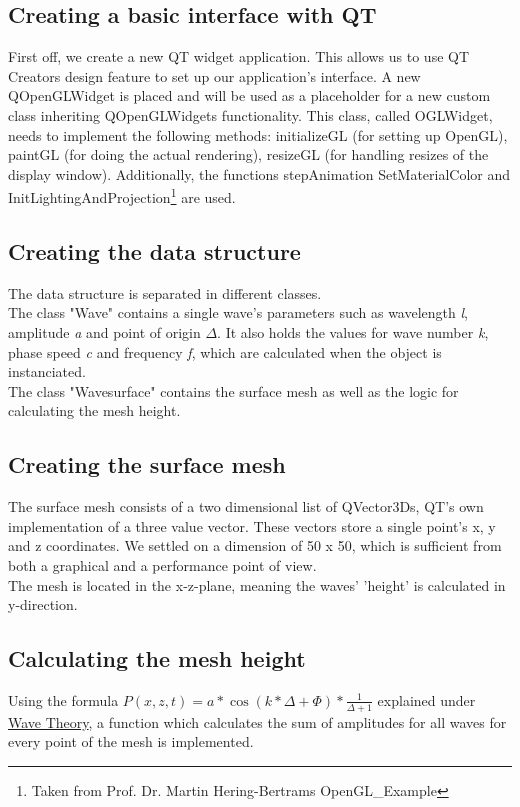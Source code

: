 \documentclass[12pt,a4paper]{scrartcl}
\begin{document}
\subsection{Creating a basic interface with QT}
First off, we create a new QT widget application. This allows us to use QT Creators design feature to set up our application's interface. A new QOpenGLWidget is placed and will be used as a placeholder for a new custom class inheriting QOpenGLWidgets functionality. This class, called OGLWidget, needs to implement the following methods: initializeGL (for setting up OpenGL), paintGL (for doing the actual rendering), resizeGL (for handling resizes of the display window). Additionally, the functions stepAnimation SetMaterialColor and InitLightingAndProjection\footnote{Taken from Prof. Dr. Martin Hering-Bertrams OpenGL_Example} are used.

\subsection{Creating the data structure}
The data structure is separated in different classes. \\
The class "Wave" contains a single wave's parameters such as wavelength \textit{l}, amplitude \textit{a} and point of origin $\Delta$. It also holds the values for wave number \textit{k}, phase speed \textit{c} and frequency \textit{f}, which are calculated when the object is instanciated. \\ 
The class "Wavesurface" contains the surface mesh as well as the logic for calculating the mesh height.

\subsection{Creating the surface mesh}
The surface mesh consists of a two dimensional list of QVector3Ds, QT's own implementation of a three value vector. These vectors store a single point's x, y and z coordinates. We settled on a dimension of 50 x 50, which is sufficient from both a graphical and a performance point of view.\\
The mesh is located in the x-z-plane, meaning the waves' 'height' is calculated in y-direction.\\

\subsection{Calculating the mesh height}
Using the formula $P(x,z,t) = a * \cos(k * {\Delta} + \Phi) * \frac{1}{{\Delta}+1} $ explained under \hyperref[wave-theory]{Wave Theory}, a function  which calculates the sum of amplitudes for all waves for every point of the mesh is implemented.
\end{document}

